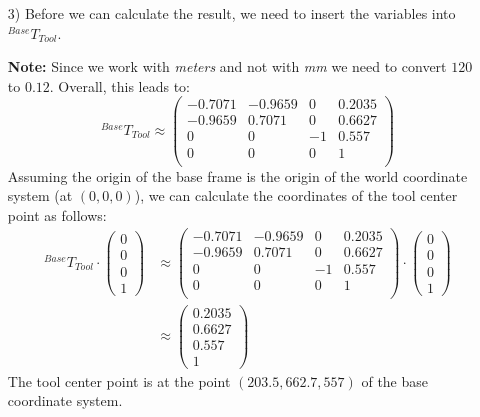 \documentclass[a4paper,11pt]{article}
\begin{document}
\begin {enumerate}
\begin{enumerate}
\newpage
        \item[3)] Before we can calculate the result, we need to insert the variables into ${^{Base}T_{Tool}}$.

        \textbf{Note:} Since we work with \textit{meters} and not with \textit{mm} we need to convert $120$ to $0.12$. Overall, this leads to:
        $${^{Base}T_{Tool}} \approx \begin{pmatrix}
            -0.7071 & -0.9659 & 0 & 0.2035\\
            -0.9659 & 0.7071 & 0 & 0.6627\\
            0 & 0 & -1 & 0.557\\
            0 & 0 & 0 & 1 \\
        \end{pmatrix}$$
        Assuming the origin of the base frame is the origin of the world coordinate system (at $(0,0,0)$), we can calculate the coordinates of the tool center point as follows:
        \begin{align*}
            {^{Base}T_{Tool}} \cdot \begin{pmatrix}
                0\\0\\0\\1
            \end{pmatrix} &\approx \begin{pmatrix}
            -0.7071 & -0.9659 & 0 & 0.2035\\
            -0.9659 & 0.7071 & 0 & 0.6627\\
            0 & 0 & -1 & 0.557\\
            0 & 0 & 0 & 1 \\
        \end{pmatrix} \cdot \begin{pmatrix}
                0\\0\\0\\1
            \end{pmatrix}\\
        &\approx \begin{pmatrix}
                0.2035\\0.6627\\0.557\\1
            \end{pmatrix}
        \end{align*}
        The tool center point is at the point $(203.5, 662.7, 557)$ of the base coordinate system.


    \end{enumerate}

\end {enumerate}
\end{document}

